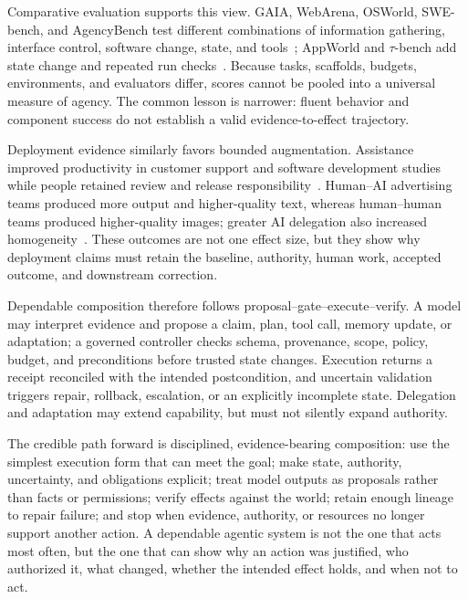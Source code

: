Comparative evaluation supports this view. GAIA, WebArena, OSWorld, SWE-bench, and AgencyBench test different combinations of information gathering, interface control, software change, state, and tools~\cite{mialon2024gaia,zhou2024webarena,xie2024osworld,jimenez2024swebench,li2026agencybench}; AppWorld and $\tau$-bench add state change and repeated run checks~\cite{trivedi2024appworld,yao2024taubench}. Because tasks, scaffolds, budgets, environments, and evaluators differ, scores cannot be pooled into a universal measure of agency. The common lesson is narrower: fluent behavior and component success do not establish a valid evidence-to-effect trajectory.

Deployment evidence similarly favors bounded augmentation. Assistance improved productivity in customer support and software development studies while people retained review and release responsibility~\cite{brynjolfsson2025generativeaiatwork,cui2026highskilledwork}. Human--AI advertising teams produced more output and higher-quality text, whereas human--human teams produced higher-quality images; greater AI delegation also increased homogeneity~\cite{ju2026collaborating}. These outcomes are not one effect size, but they show why deployment claims must retain the baseline, authority, human work, accepted outcome, and downstream correction.

Dependable composition therefore follows proposal--gate--execute--verify. A model may interpret evidence and propose a claim, plan, tool call, memory update, or adaptation; a governed controller checks schema, provenance, scope, policy, budget, and preconditions before trusted state changes. Execution returns a receipt reconciled with the intended postcondition, and uncertain validation triggers repair, rollback, escalation, or an explicitly incomplete state. Delegation and adaptation may extend capability, but must not silently expand authority.

The credible path forward is disciplined, evidence-bearing composition: use the simplest execution form that can meet the goal; make state, authority, uncertainty, and obligations explicit; treat model outputs as proposals rather than facts or permissions; verify effects against the world; retain enough lineage to repair failure; and stop when evidence, authority, or resources no longer support another action. A dependable agentic system is not the one that acts most often, but the one that can show why an action was justified, who authorized it, what changed, whether the intended effect holds, and when not to act.
